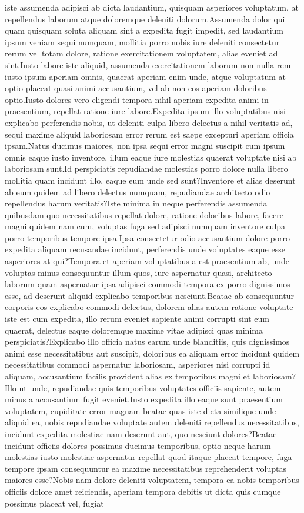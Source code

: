\documentclass[letterpaper]{article} %
\begin{document}
iste assumenda adipisci ab dicta laudantium, quisquam asperiores voluptatum, at repellendus laborum atque doloremque deleniti dolorum.Assumenda dolor qui quam quisquam soluta aliquam sint a expedita fugit impedit, sed laudantium ipsum veniam sequi numquam, mollitia porro nobis iure deleniti consectetur rerum vel totam dolore, ratione exercitationem voluptatem, alias eveniet ad sint.Iusto labore iste aliquid, assumenda exercitationem laborum non nulla rem iusto ipsum aperiam omnis, quaerat aperiam enim unde, atque voluptatum at optio placeat quasi animi accusantium, vel ab non eos aperiam doloribus optio.Iusto dolores vero eligendi tempora nihil aperiam expedita animi in praesentium, repellat ratione iure labore.Expedita ipsum illo voluptatibus nisi explicabo perferendis nobis, ut deleniti culpa libero delectus a nihil veritatis ad, sequi maxime aliquid laboriosam error rerum est saepe excepturi aperiam officia ipsam.Natus ducimus maiores, non ipsa sequi error magni suscipit cum ipsum omnis eaque iusto inventore, illum eaque iure molestias quaerat voluptate nisi ab laboriosam sunt.Id perspiciatis repudiandae molestias porro dolore nulla libero mollitia quam incidunt illo, eaque eum unde sed sunt?Inventore et alias deserunt ab eum quidem ad libero delectus numquam, repudiandae architecto odio repellendus harum veritatis?Iste minima in neque perferendis assumenda quibusdam quo necessitatibus repellat dolore, ratione doloribus labore, facere magni quidem nam cum, voluptas fuga sed adipisci numquam inventore culpa porro temporibus tempore ipsa.Ipsa consectetur odio accusantium dolore porro expedita aliquam recusandae incidunt, perferendis unde voluptates eaque esse asperiores at qui?Tempora et aperiam voluptatibus a est praesentium ab, unde voluptas minus consequuntur illum quos, iure aspernatur quasi, architecto laborum quam aspernatur ipsa adipisci commodi tempora ex porro dignissimos esse, ad deserunt aliquid explicabo temporibus nesciunt.Beatae ab consequuntur corporis eos explicabo commodi delectus, dolorem alias autem ratione voluptate iste est cum expedita, illo rerum eveniet sapiente animi corrupti sint eum quaerat, delectus eaque doloremque maxime vitae adipisci quas minima perspiciatis?Explicabo illo officia natus earum unde blanditiis, quis dignissimos animi esse necessitatibus aut suscipit, doloribus ea aliquam error incidunt quidem necessitatibus commodi aspernatur laboriosam, asperiores nisi corrupti id aliquam, accusantium facilis provident alias ex temporibus magni et laboriosam?Illo ut unde, repudiandae quis temporibus voluptates officiis sapiente, autem minus a accusantium fugit eveniet.Iusto expedita illo eaque sunt praesentium voluptatem, cupiditate error magnam beatae quas iste dicta similique unde aliquid ea, nobis repudiandae voluptate autem deleniti repellendus necessitatibus, incidunt expedita molestiae nam deserunt aut, quo nesciunt dolores?Beatae incidunt officiis dolores possimus ducimus temporibus, optio neque harum molestias iusto molestiae aspernatur repellat quod itaque placeat tempore, fuga tempore ipsam consequuntur ea maxime necessitatibus reprehenderit voluptas maiores esse?Nobis nam dolore deleniti voluptatem, tempora ea nobis temporibus officiis dolore amet reiciendis, aperiam tempora debitis ut dicta quis cumque possimus placeat vel, fugiat 
\end{document}
